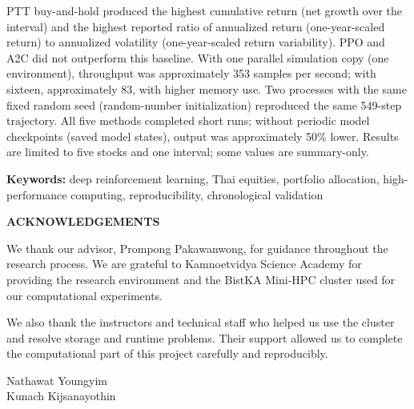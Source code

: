 \documentclass[12pt,a4paper,oneside]{book}
\theoremstyle{plain}
\numberwithin{equation}{chapter} \DeclareMathOperator{\Var}{Var}
\newcommand{\ProjectAuthorOne}{Nathawat Youngyim}
\newcommand{\ProjectAuthorTwo}{Kunach Kijsanayothin}
\newcommand{\AdvisorName}{Prompong Pakawanwong}
\begin{document}
PTT buy-and-hold produced the highest cumulative return (net growth over the interval) and the highest reported ratio of annualized return (one-year-scaled return) to annualized volatility (one-year-scaled return variability). PPO and A2C did not outperform this baseline. With one parallel simulation copy (one environment), throughput was approximately 353 samples per second; with sixteen, approximately 83, with higher memory use. Two processes with the same fixed random seed (random-number initialization) reproduced the same 549-step trajectory. All five methods completed short runs; without periodic model checkpoints (saved model states), output was approximately 50\% lower. Results are limited to five stocks and one interval; some values are summary-only.

\par\medskip
\noindent\begin{minipage}{\textwidth}
\small\textbf{Keywords:} deep reinforcement learning, Thai equities, portfolio allocation, high-performance computing, reproducibility, chronological validation
\end{minipage}

\newpage
\begin{center}
  \large\textbf{ACKNOWLEDGEMENTS}
\end{center}

We thank our advisor, \AdvisorName, for guidance throughout the research process. We are grateful to Kamnoetvidya Science Academy for providing the research environment and the BistKA Mini-HPC cluster used for our computational experiments.

We also thank the instructors and technical staff who helped us use the cluster and resolve storage and runtime problems. Their support allowed us to complete the computational part of this project carefully and reproducibly.

\vfill
\begin{flushright}
\ProjectAuthorOne\\
\ProjectAuthorTwo
\end{flushright}

\newpage
\tableofcontents

\newpage
{}
\listoffigures

\newpage
{}
\listoftables

\clearpage
{}

\end{document}
